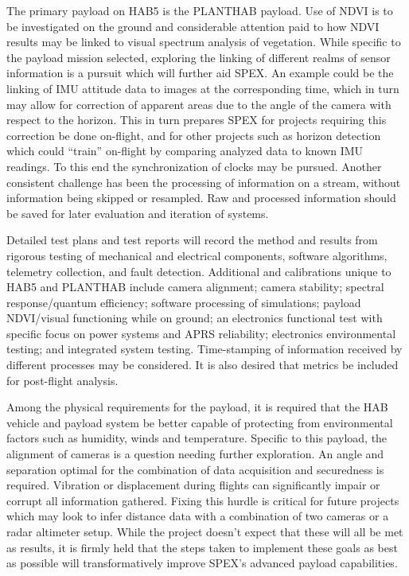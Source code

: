 \documentclass[conference]{IEEEtran} %
\begin{document}
The primary payload on HAB5 is the PLANTHAB payload.
Use of NDVI is to be investigated on the ground and considerable attention paid to how NDVI results may be linked to visual spectrum analysis of vegetation. 
While specific to the payload mission selected, exploring the linking of different realms of sensor information is a pursuit which will further aid SPEX. 
An example could be the linking of IMU attitude data to images at the corresponding time, which in turn may allow for correction of apparent areas due to the angle of the camera with respect to the horizon. 
This in turn prepares SPEX for projects requiring this correction be done on-flight, and for other projects such as horizon detection which could ``train'' on-flight by comparing analyzed data to known IMU readings. 
To this end the synchronization of clocks may be pursued. 
Another consistent challenge has been the processing of information on a stream, without information being skipped or resampled. 
Raw and processed information should be saved for later evaluation and iteration of systems.

Detailed test plans and test reports will record the method and results from rigorous testing of mechanical and electrical components, software algorithms, telemetry collection, and fault detection.
Additional and calibrations unique to HAB5 and PLANTHAB include camera alignment; camera stability; spectral response/quantum efficiency; software processing of simulations; payload NDVI/visual functioning while on ground; an electronics functional test with specific focus on power systems and APRS reliability; electronics environmental testing; and integrated system testing.
Time-stamping of information received by different processes may be considered. 
It is also desired that metrics be included for post-flight analysis.

Among the physical requirements for the payload, it is required that the HAB vehicle and payload system be better capable of protecting from environmental factors such as humidity, winds and temperature. Specific to this payload, the alignment of cameras is a question needing further exploration. An angle and separation optimal for the combination of data acquisition and securedness is required. Vibration or displacement during flights can significantly impair or corrupt all information gathered. Fixing this hurdle is critical for future projects which may look to infer distance data with a combination of two cameras or a radar altimeter setup. While the project doesn't expect that these will all be met as results, it is firmly held that the steps taken to implement these goals as best as possible will transformatively improve SPEX's advanced payload capabilities.
\end{document}
